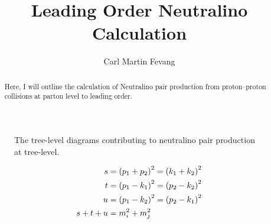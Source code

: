 \documentclass[english,notitlepage]{article}
\title{Leading Order Neutralino Calculation}
\author{Carl Martin Fevang}
\begin{document}
\maketitle

\begin{abstract}
    \noindent
    Here, I will outline the calculation of Neutralino pair production from proton--proton collisions at parton level to leading order.
\end{abstract}


\begin{figure} [ht!]
    \centering
    \caption{The tree-level diagrams contributing to neutralino pair production at tree-level.}
\end{figure}

\begin{subequations}
    \begin{align}
        s         & = \left(p_1 + p_2\right)^2 = \left(k_1 + k_2\right)^2 \\
        t         & = \left(p_1-k_1\right)^2 = \left(p_2-k_2\right)^2     \\
        u         & = \left(p_1-k_2\right)^2 = \left(p_2-k_1\right)^2     \\
        s + t + u & = m_i^2 + m_j^2
    \end{align}
\end{subequations}
\end{document}
